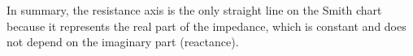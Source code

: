 In summary, the resistance axis is the only straight line on the Smith chart because it represents the real part of the impedance, which is constant and does not depend on the imaginary part (reactance).

